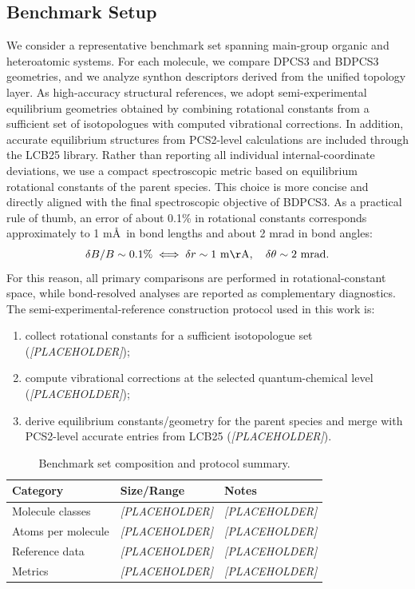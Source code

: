 \documentclass[journal=jctcce,manuscript=article]{achemso}
\begin{document}
\subsection{Benchmark Setup}
We consider a representative benchmark set spanning main-group organic and heteroatomic systems. For each molecule, we compare DPCS3 and BDPCS3 geometries, and we analyze synthon descriptors derived from the unified topology layer.
As high-accuracy structural references, we adopt semi-experimental equilibrium geometries obtained by combining rotational constants from a sufficient set of isotopologues with computed vibrational corrections. In addition, accurate equilibrium structures from PCS2-level calculations are included through the LCB25 library.
Rather than reporting all individual internal-coordinate deviations, we use a compact spectroscopic metric based on equilibrium rotational constants of the parent species. This choice is more concise and directly aligned with the final spectroscopic objective of BDPCS3. As a practical rule of thumb, an error of about 0.1\% in rotational constants corresponds approximately to 1 m\AA\ in bond lengths and about 2 mrad in bond angles:
\begin{equation}
\delta B/B \sim 0.1\%
\;\Longleftrightarrow\;
\delta r \sim 1~\mathrm{m\AA},\quad
\delta\theta \sim 2~\mathrm{mrad}.
\end{equation}
For this reason, all primary comparisons are performed in rotational-constant space, while bond-resolved analyses are reported as complementary diagnostics.
The semi-experimental-reference construction protocol used in this work is:
\begin{enumerate}
\item collect rotational constants for a sufficient isotopologue set (\textit{[PLACEHOLDER]});
\item compute vibrational corrections at the selected quantum-chemical level (\textit{[PLACEHOLDER]});
\item derive equilibrium constants/geometry for the parent species and merge with PCS2-level accurate entries from LCB25 (\textit{[PLACEHOLDER]}).
\end{enumerate}

\begin{table}[ht]
\caption{Benchmark set composition and protocol summary.}
\label{tab:benchmark_protocol}
\centering
\begin{tabular}{lll}
\toprule
Category & Size/Range & Notes \\
\midrule
Molecule classes & \textit{[PLACEHOLDER]} & \textit{[PLACEHOLDER]} \\
Atoms per molecule & \textit{[PLACEHOLDER]} & \textit{[PLACEHOLDER]} \\
Reference data & \textit{[PLACEHOLDER]} & \textit{[PLACEHOLDER]} \\
Metrics & \textit{[PLACEHOLDER]} & \textit{[PLACEHOLDER]} \\
\bottomrule
\end{tabular}
\end{table}
\end{document}
